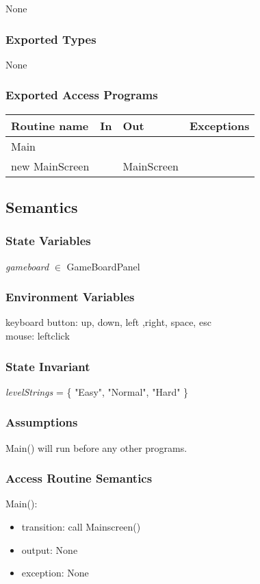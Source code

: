 \documentclass[12pt, titlepage]{article}
\begin{document}
None

\subsubsection* {Exported Types}

None

\subsubsection* {Exported Access Programs}

\begin{tabular}{| l | l | l | l |}
\hline
\textbf{Routine name} & \textbf{In} & \textbf{Out} & \textbf{Exceptions}\\
\hline
Main &  &  &\\
\hline
new MainScreen &  & MainScreen & \\
\hline
\end{tabular}

\subsection* {Semantics}

\subsubsection* {State Variables}

\textit{gameboard} $\in$ GameBoardPanel

\subsubsection* {Environment Variables}

keyboard button: up, down, left ,right, space, esc\\
mouse: leftclick
\subsubsection* {State Invariant}

\textit{levelStrings} = \{ "Easy", "Normal", "Hard" \}

\subsubsection* {Assumptions}
Main() will run before any other programs.

\subsubsection* {Access Routine Semantics}
Main():
\begin{itemize}
\item transition: call Mainscreen()
\item output: None
\item exception: None
\end{itemize}
\end{document}
